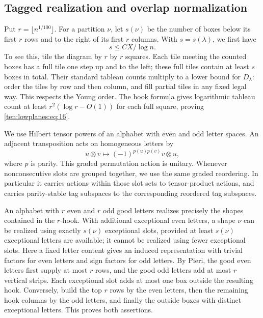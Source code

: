 \subsection{Tagged realization and overlap normalization}

Put \(r=\lfloor n^{1/100}\rfloor\).  For a partition \(\nu\), let
\(s(\nu)\) be the number of boxes below its first \(r\) rows and to the
right of its first \(r\) columns.  With \(s=s(\lambda)\), we first have
\begin{equation}
 s\le C X/\log n.
 \label{ten:lowplanes:eq:16}
\end{equation}
To see this, tile the diagram by \(r\) by \(r\) squares.  Each tile
meeting the counted boxes has a full tile one step up and to the left;
these full tiles contain at least \(s\) boxes in total.  Their standard
tableau counts multiply to a lower bound for \(D_\lambda\): order the
tiles by row and then column, and fill partial tiles in any fixed legal
way.  This respects the Young order.  The hook formula gives logarithmic
tableau count at least \(r^2(\log r-O(1))\) for each full square, proving
\eqref{ten:lowplanes:eq:16}.

We use Hilbert tensor powers of an alphabet with even and odd letter
spaces.  An adjacent transposition acts on homogeneous letters by
\[
 u\otimes v\longmapsto(-1)^{p(u)p(v)}v\otimes u,
\]
where \(p\) is parity.  This graded permutation action is unitary.
Whenever nonconsecutive slots are grouped together, we use the same
graded reordering.  In particular it carries actions within those slot
sets to tensor-product actions, and carries parity-stable tag subspaces
to the corresponding reordered tag subspaces.

An alphabet with \(r\) even and \(r\) odd good letters realizes precisely
the shapes contained in the \(r\)-hook.  With additional exceptional even
letters, a shape \(\nu\) can be realized using exactly \(s(\nu)\)
exceptional slots, provided at least \(s(\nu)\) exceptional letters are
available; it cannot be realized using fewer exceptional slots.  Here a fixed
letter content gives an induced representation with trivial factors
for even letters and sign factors for odd letters.  By Pieri, the good
even letters first supply at most \(r\) rows, and the good odd letters
add at most \(r\) vertical strips.  Each exceptional slot adds at most
one box outside the resulting hook.  Conversely, build the top \(r\)
rows by the even letters, then the remaining hook columns by the odd
letters, and finally the outside boxes with distinct exceptional letters.
This proves both assertions.

